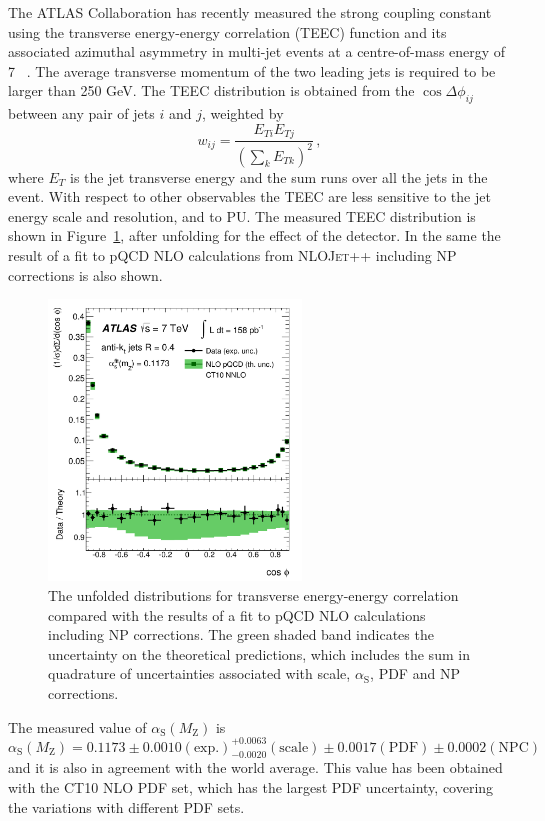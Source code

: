 \documentclass{PoS}
\providecommand{\NLOJETPP} {{\textsc{NLOJet++}}\xspace}
\def\as{\ensuremath{\alpha_\mathrm{S}}\xspace}
\providecommand{\alpsmz}{\ensuremath{\alpha_\mathrm{S}(M_\mathrm{Z})}\xspace}
\begin{document}
The ATLAS Collaboration has recently measured the strong coupling constant using the transverse energy-energy
correlation (TEEC) function and its associated azimuthal asymmetry in multi-jet events at a
centre-of-mass energy of 7 \TeV~\cite{ATLAS:2015yaa}. The average transverse momentum of the two leading jets is
required to be larger than 250 GeV. The TEEC distribution is obtained from the $\cos\Delta\phi_{ij}$ between any pair of
jets $i$ and $j$, weighted by $$w_{ij} = \frac{E_{Ti}E_{Tj}}{(\sum_k E_{Tk})^2} \, ,$$ where $E_T$ is the jet transverse
energy and the sum runs over all the jets in the event. With respect to other observables the TEEC are less sensitive to the jet energy scale and resolution,
and to PU. The measured TEEC distribution is shown in Figure~\ref{fig:TEEC}, after unfolding for the effect of
the detector. In the same the result of a fit to pQCD NLO calculations from \NLOJETPP including NP
corrections is also shown. 
\begin{figure}[hbpt]
  \centering
  \includegraphics[width=0.6\textwidth]{Figure5.pdf}
  \caption{The unfolded distributions for transverse energy-energy correlation compared with the results of a fit to
    pQCD NLO calculations including NP corrections. The green shaded band indicates the uncertainty on the
    theoretical predictions, which includes the sum in quadrature of uncertainties associated with scale, \as, PDF and
    NP corrections.}
  \label{fig:TEEC}
\end{figure}
The measured value of \alpsmz is 
$$ \alpsmz  = 0.1173 \pm 0.0010 \mathrm{(exp.)} ^{+0.0063}_{-0.0020} \mathrm{(scale)} \pm 0.0017 \mathrm{(PDF)} \pm
0.0002 \mathrm{(NPC)} \, $$
and it is also in agreement with the world average. This value has been obtained with the CT10 NLO PDF set, which has
the largest PDF uncertainty, covering the variations with different PDF sets.
\end{document}

